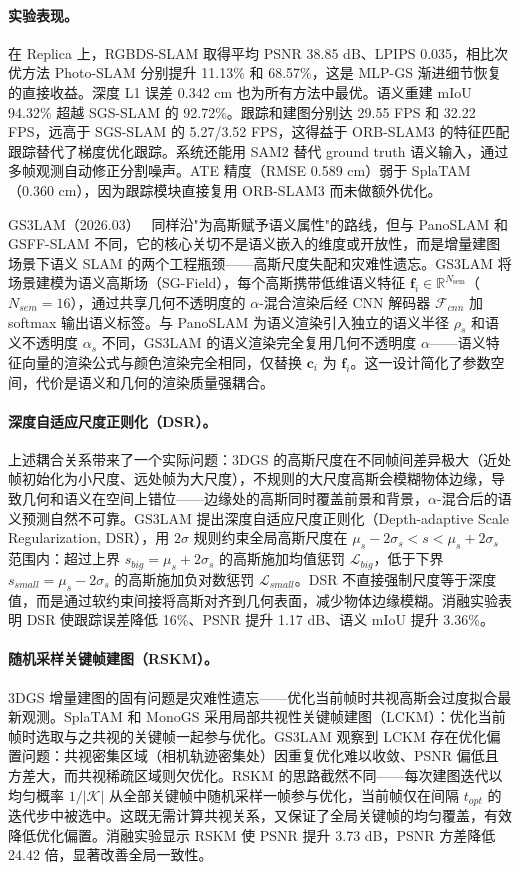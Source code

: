 \paragraph{实验表现。}
在 Replica 上，RGBDS-SLAM 取得平均 PSNR 38.85 dB、LPIPS 0.035，相比次优方法 Photo-SLAM 分别提升 11.13\% 和 68.57\%，这是 MLP-GS 渐进细节恢复的直接收益。深度 L1 误差 0.342 cm 也为所有方法中最优。语义重建 mIoU 94.32\% 超越 SGS-SLAM 的 92.72\%。跟踪和建图分别达 29.55 FPS 和 32.22 FPS，远高于 SGS-SLAM 的 5.27/3.52 FPS，这得益于 ORB-SLAM3 的特征匹配跟踪替代了梯度优化跟踪。系统还能用 SAM2 替代 ground truth 语义输入，通过多帧观测自动修正分割噪声。ATE 精度（RMSE 0.589 cm）弱于 SplaTAM（0.360 cm），因为跟踪模块直接复用 ORB-SLAM3 而未做额外优化。

GS3LAM（2026.03）~\cite{2603_27781} 同样沿"为高斯赋予语义属性"的路线，但与 PanoSLAM 和 GSFF-SLAM 不同，它的核心关切不是语义嵌入的维度或开放性，而是增量建图场景下语义 SLAM 的两个工程瓶颈——高斯尺度失配和灾难性遗忘。GS3LAM 将场景建模为语义高斯场（SG-Field），每个高斯携带低维语义特征 $\mathbf{f}_i \in \mathbb{R}^{N_{\mathrm{sem}}}$（$N_{sem}=16$），通过共享几何不透明度的 $\alpha$-混合渲染后经 CNN 解码器 $\mathcal{F}_{cnn}$ 加 softmax 输出语义标签。与 PanoSLAM 为语义渲染引入独立的语义半径 $\rho_s$ 和语义不透明度 $\alpha_s$ 不同，GS3LAM 的语义渲染完全复用几何不透明度 $\alpha$——语义特征向量的渲染公式与颜色渲染完全相同，仅替换 $\mathbf{c}_i$ 为 $\mathbf{f}_i$。这一设计简化了参数空间，代价是语义和几何的渲染质量强耦合。

\paragraph{深度自适应尺度正则化（DSR）。}
上述耦合关系带来了一个实际问题：3DGS 的高斯尺度在不同帧间差异极大（近处帧初始化为小尺度、远处帧为大尺度），不规则的大尺度高斯会模糊物体边缘，导致几何和语义在空间上错位——边缘处的高斯同时覆盖前景和背景，$\alpha$-混合后的语义预测自然不可靠。GS3LAM 提出深度自适应尺度正则化（Depth-adaptive Scale Regularization, DSR），用 $2\sigma$ 规则约束全局高斯尺度在 $\mu_s - 2\sigma_s < s < \mu_s + 2\sigma_s$ 范围内：超过上界 $s_{big} = \mu_s + 2\sigma_s$ 的高斯施加均值惩罚 $\mathcal{L}_{big}$，低于下界 $s_{small} = \mu_s - 2\sigma_s$ 的高斯施加负对数惩罚 $\mathcal{L}_{small}$。DSR 不直接强制尺度等于深度值，而是通过软约束间接将高斯对齐到几何表面，减少物体边缘模糊。消融实验表明 DSR 使跟踪误差降低 16\%、PSNR 提升 1.17 dB、语义 mIoU 提升 3.36\%。

\paragraph{随机采样关键帧建图（RSKM）。}
3DGS 增量建图的固有问题是灾难性遗忘——优化当前帧时共视高斯会过度拟合最新观测。SplaTAM 和 MonoGS 采用局部共视性关键帧建图（LCKM）：优化当前帧时选取与之共视的关键帧一起参与优化。GS3LAM 观察到 LCKM 存在优化偏置问题：共视密集区域（相机轨迹密集处）因重复优化难以收敛、PSNR 偏低且方差大，而共视稀疏区域则欠优化。RSKM 的思路截然不同——每次建图迭代以均匀概率 $1/|\mathcal{K}|$ 从全部关键帧中随机采样一帧参与优化，当前帧仅在间隔 $t_{opt}$ 的迭代步中被选中。这既无需计算共视关系，又保证了全局关键帧的均匀覆盖，有效降低优化偏置。消融实验显示 RSKM 使 PSNR 提升 3.73 dB，PSNR 方差降低 24.42 倍，显著改善全局一致性。

